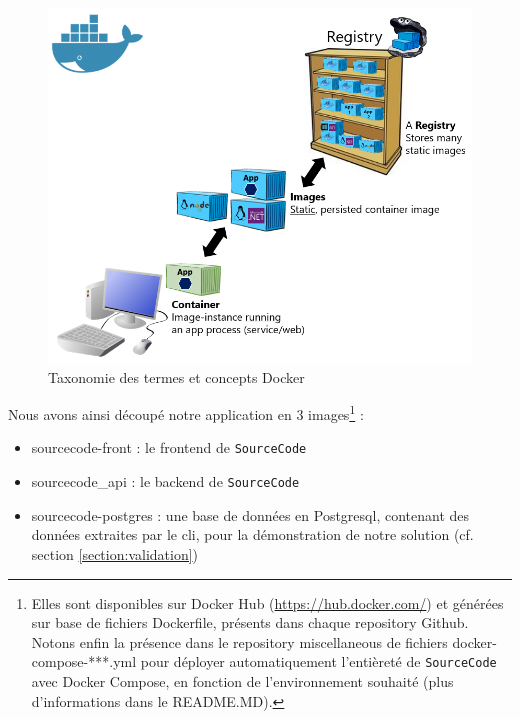 \begin{figure}[H]
    \includegraphics[width=\textwidth,height=0.38\textheight,keepaspectratio]{images/serveur/dockerTaxonomy.png}
    \centering
    \caption[Taxonomie des termes et concepts Docker]{Taxonomie des termes et concepts Docker \footnotemark}
    \label{fig:dockerTaxonomy}
\end{figure}

Nous avons ainsi découpé notre application en 3 images\footnote{
    Elles sont disponibles sur Docker Hub (\url{https://hub.docker.com/}) 
    et générées sur base de fichiers Dockerfile, présents dans chaque repository Github.
    Notons enfin la présence dans le repository miscellaneous de fichiers docker-compose-***.yml pour déployer automatiquement l'entièreté de \texttt{SourceCode} avec Docker Compose, en fonction de l'environnement souhaité (plus d'informations dans le README.MD).
} :

\begin{itemize}[nosep,noitemsep,topsep=0pt,partopsep=0pt,after=\vspace*{2pt}]
    \item sourcecode-front : le \gls{frontend} de \texttt{SourceCode}
    \item sourcecode\_api : le \gls{backend} de \texttt{SourceCode}
    \item sourcecode-postgres : une base de données en Postgresql, contenant des données extraites par le \Gls{cli}, pour la démonstration de notre solution (cf. section \ref{section:validation})
\end{itemize}

